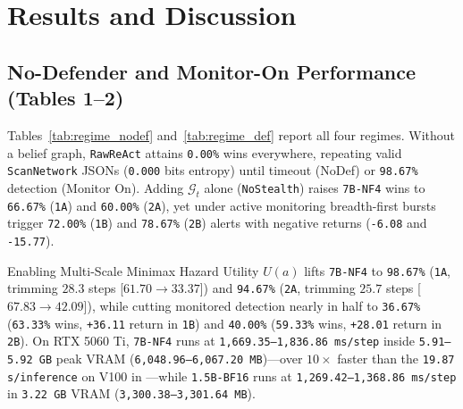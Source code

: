\documentclass[a4paper,fleqn]{cas-dc}
\begin{document}
\section{Results and Discussion}
\label{sec:results}

\subsection{No-Defender and Monitor-On Performance (Tables 1--2)}
Tables~\ref{tab:regime_nodef} and~\ref{tab:regime_def} report all four regimes. Without a belief graph, \texttt{RawReAct} attains \texttt{0.00\%} wins everywhere, repeating valid \texttt{ScanNetwork} JSONs (\texttt{0.000} bits entropy) until timeout (NoDef) or \texttt{98.67\%} detection (Monitor On). Adding $\mathcal{G}_t$ alone (\texttt{NoStealth}) raises \texttt{7B-NF4} wins to \texttt{66.67\%} (\texttt{1A}) and \texttt{60.00\%} (\texttt{2A}), yet under active monitoring breadth-first bursts trigger \texttt{72.00\%} (\texttt{1B}) and \texttt{78.67\%} (\texttt{2B}) alerts with negative returns (\texttt{-6.08} and \texttt{-15.77}).

Enabling Multi-Scale Minimax Hazard Utility $U(a)$ lifts \texttt{7B-NF4} to \texttt{98.67\%} (\texttt{1A}, trimming $28.3$ steps [$61.70 \rightarrow 33.37$]) and \texttt{94.67\%} (\texttt{2A}, trimming $25.7$ steps [$67.83 \rightarrow 42.09$]), while cutting monitored detection nearly in half to \texttt{36.67\%} (\texttt{63.33\%} wins, \texttt{+36.11} return in \texttt{1B}) and \texttt{40.00\%} (\texttt{59.33\%} wins, \texttt{+28.01} return in \texttt{2B}). On RTX 5060 Ti, \texttt{7B-NF4} runs at \texttt{1,669.35--1,836.86 ms/step} inside \texttt{5.91--5.92 GB} peak VRAM (\texttt{6,048.96--6,067.20 MB})---over $10\times$ faster than the \texttt{19.87 s/inference} on V100 in \citet{rigaki2026building}---while \texttt{1.5B-BF16} runs at \texttt{1,269.42--1,368.86 ms/step} in \texttt{3.22 GB} VRAM (\texttt{3,300.38--3,301.64 MB}).
\end{document}
